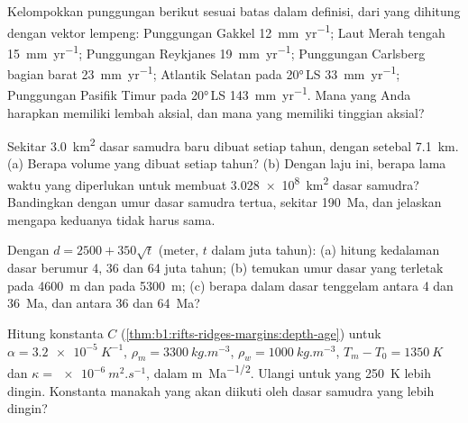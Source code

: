 \begin{exercise}[$\star$]\label{exo:b1:rifts-ridges-margins:3}
Kelompokkan punggungan berikut sesuai batas dalam definisi, dari  yang dihitung dengan vektor lempeng: Punggungan Gakkel \qty{12}{mm.yr^{-1}}; Laut Merah tengah \qty{15}{mm.yr^{-1}}; Punggungan Reykjanes \qty{19}{mm.yr^{-1}}; Punggungan Carlsberg bagian barat \qty{23}{mm.yr^{-1}}; Atlantik Selatan pada \ang{20}\,LS \qty{33}{mm.yr^{-1}}; Punggungan Pasifik Timur pada \ang{20}\,LS \qty{143}{mm.yr^{-1}}. Mana yang Anda harapkan memiliki lembah aksial, dan mana yang memiliki tinggian aksial?
\end{exercise}

\begin{exercise}[$\star$]\label{exo:b1:rifts-ridges-margins:4}
Sekitar \qty{3.0}{km^2} dasar samudra baru dibuat setiap tahun, dengan  setebal \qty{7.1}{km}. (a) Berapa volume  yang dibuat setiap tahun? (b) Dengan laju ini, berapa lama waktu yang diperlukan untuk membuat \qty{3.028e8}{km^2} dasar samudra? Bandingkan dengan umur dasar samudra tertua, sekitar \qty{190}{Ma}, dan jelaskan mengapa keduanya tidak harus sama.
\end{exercise}

\begin{exercise}[$\star\star$]\label{exo:b1:rifts-ridges-margins:5}
Dengan $d = 2500 + 350\sqrt t$ (meter, $t$ dalam juta tahun): (a) hitung kedalaman dasar berumur 4, 36 dan 64 juta tahun; (b) temukan umur dasar yang terletak pada \qty{4600}{m} dan pada \qty{5300}{m}; (c) berapa dalam dasar tenggelam antara 4 dan \qty{36}{Ma}, dan antara 36 dan \qty{64}{Ma}?
\end{exercise}

\begin{exercise}[$\star\star$]\label{exo:b1:rifts-ridges-margins:6}
Hitung konstanta $C$ 
(\cref{thm:b1:rifts-ridges-margins:depth-age}) untuk $\alpha =
\qty{3.2e-5}{K^{-1}}$, $\rho_m = \qty{3300}{kg.m^{-3}}$, $\rho_w =
\qty{1000}{kg.m^{-3}}$, $T_m - T_0 = \qty{1350}{K}$ dan $\kappa =
\qty{e-6}{m^2.s^{-1}}$, dalam \unit{m.Ma^{-1/2}}. Ulangi untuk  yang
\qty{250}{K} lebih dingin. Konstanta manakah yang akan diikuti oleh dasar samudra yang lebih dingin?
\end{exercise}

